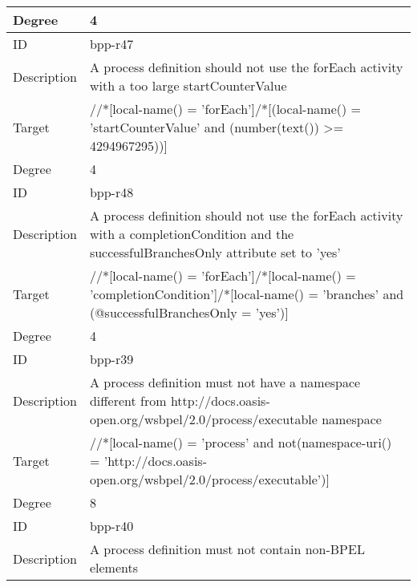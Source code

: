 \begin{center}
\begin{tiny}
\begin{longtable}{p{}|p{}}
\myrowcolour
Degree & 4\\
\midrule
ID & bpp-r47\\
\myrowcolour
Description &A process definition should not use the forEach activity with a too large startCounterValue\\
Target & //*[local-name() = 'forEach']/*[(local-name() = 'startCounterValue' and (number(text()) >= 4294967295))]\\
\myrowcolour
Degree & 4\\
\midrule
ID & bpp-r48\\
\myrowcolour
Description &A process definition should not use the forEach activity with a completionCondition and the successfulBranchesOnly attribute set to 'yes'\\
Target & //*[local-name() = 'forEach']/*[local-name() = 'completionCondition']/*[local-name() = 'branches' and (@successfulBranchesOnly = 'yes')]\\
\myrowcolour
Degree & 4\\
\midrule
ID & bpp-r39\\
\myrowcolour
Description &A process definition must not have a namespace different from http://docs.oasis-open.org/wsbpel/2.0/process/executable namespace\\
Target & //*[local-name() = 'process' and not(namespace-uri() = 'http://docs.oasis-open.org/wsbpel/2.0/process/executable')]\\
\myrowcolour
Degree & 8\\
\midrule
ID & bpp-r40\\
\myrowcolour
Description &A process definition must not contain non-BPEL elements\\

\end{longtable}
\end{tiny}
\end{center}
